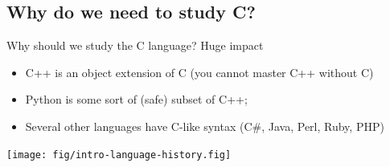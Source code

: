 \subsection{Why do we need to study C?}
\begin{frame}{Why should we study the C language? Huge impact}
    \begin{itemize}
    \item C++ is an object extension of C (you cannot master C++ without C)
    \item Python is some sort of (safe) subset of C++;
    \item Several other languages have C-like syntax (C\#, Java, Perl, Ruby, PHP)
    \end{itemize}    
  \vspace{-.8\baselineskip}
  \centerline{\texttt{[image: fig/intro-language-history.fig]}~~%
  ~~%
  }
\end{frame}
        
        

